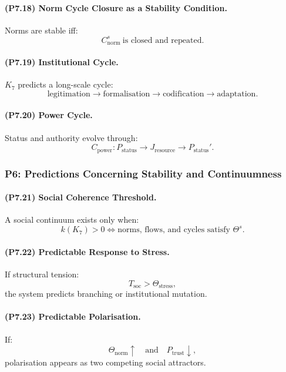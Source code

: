 \paragraph{(P7.18) Norm Cycle Closure as a Stability Condition.}
Norms are stable iff:
\[
C_{\mathrm{norm}}^s \ \text{is closed and repeated}.
\]

\paragraph{(P7.19) Institutional Cycle.}
$K_7$ predicts a long-scale cycle:
\[
\text{legitimation} \to \text{formalisation} \to \text{codification} \to \text{adaptation}.
\]

\paragraph{(P7.20) Power Cycle.}
Status and authority evolve through:
\[
C_{\mathrm{power}}: P_{\mathrm{status}} \to J_{\mathrm{resource}} \to P_{\mathrm{status}}'.
\]

\subsubsection{P6: Predictions Concerning Stability and Continuumness}

\paragraph{(P7.21) Social Coherence Threshold.}
A social continuum exists only when:
\[
k(K_7) > 0 
\iff 
\text{norms, flows, and cycles satisfy } \Theta^s.
\]

\paragraph{(P7.22) Predictable Response to Stress.}
If structural tension:
\[
T_{\mathrm{soc}} > \Theta_{\mathrm{stress}},
\]
the system predicts branching or institutional mutation.

\paragraph{(P7.23) Predictable Polarisation.}
If:
\[
\Theta_{\mathrm{norm}} \uparrow \quad \text{and} \quad P_{\mathrm{trust}} \downarrow,
\]
polarisation appears as two competing social attractors.

